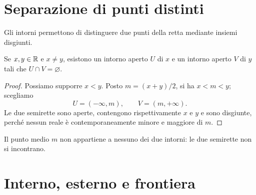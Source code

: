 
\section{Separazione di punti distinti}

Gli intorni permettono di distinguere due punti della retta mediante insiemi disgiunti.

\begin{proposizione}
Se $x,y\in\mathbb{R}$ e $x\ne y$, esistono un intorno aperto $U$ di $x$ e un intorno aperto $V$ di $y$ tali che $U\cap V=\varnothing$.
\end{proposizione}
\begin{proof}
Possiamo supporre $x<y$. Posto $m=(x+y)/2$, si ha $x<m<y$; scegliamo
\[
U=(-\infty,m),\qquad V=(m,+\infty).
\]
Le due semirette sono aperte, contengono rispettivamente $x$ e $y$ e sono disgiunte, perché nessun reale è contemporaneamente minore e maggiore di $m$.
\end{proof}

\begin{schema}
\par\smallskip Il punto medio $m$ non appartiene a nessuno dei due intorni: le due semirette non si incontrano.
\end{schema}

\section{Interno, esterno e frontiera}

